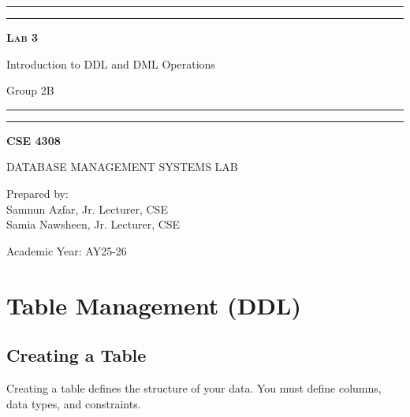\documentclass[12pt,a4paper]{article}
\begin{document}
\begin{titlepage}
    \centering
    \vspace*{2\baselineskip}

    \rule{14cm}{2pt}\vspace*{-0.8\baselineskip}\vspace*{1.5pt}
    \rule{14cm}{0.5pt}\vspace{2\baselineskip}

    {\Huge\bfseries\scshape Lab 3\par}
    \vspace{3mm}
    {\Large Introduction to DDL and DML Operations\par}
    \vspace{2mm}
    {\large Group 2B\par}
    \vspace{3mm}

    \rule{14cm}{0.5pt}\vspace*{-0.7\baselineskip}\vspace{2.5pt}
    \rule{14cm}{2pt}

    \vspace{2\baselineskip}

    {\Large\bfseries CSE 4308\par}
    \vspace{1\baselineskip}
    {\large DATABASE MANAGEMENT SYSTEMS LAB\par}

    \vfill
    {\normalsize Prepared by:\\ Samnun Azfar, Jr. Lecturer, CSE\\ Samia Nawsheen, Jr. Lecturer, CSE\par}
    {\normalsize Academic Year: AY25-26\par}
\end{titlepage}

\newpage

\section{Table Management (DDL)}

\subsection{Creating a Table}
Creating a table defines the structure of your data. You must define columns, data types, and constraints.
\end{document}

